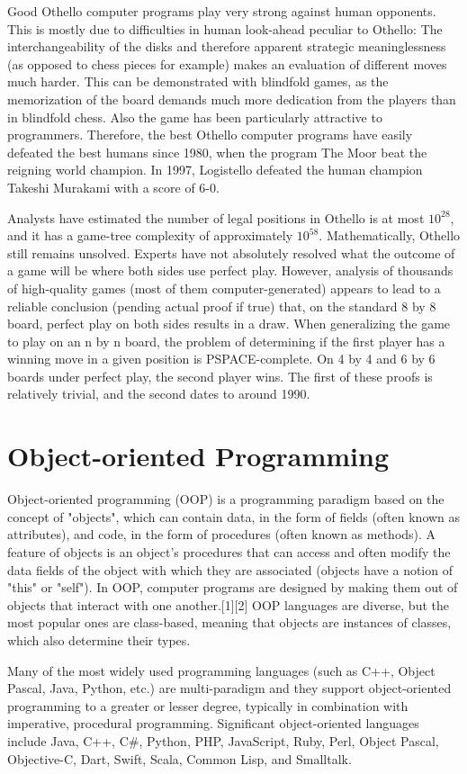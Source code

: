 \documentclass[a4paper]{report}
\begin{document}
Good Othello computer programs play very strong against human opponents. This is mostly due to difficulties in human look-ahead peculiar to Othello: The interchangeability of the disks and therefore apparent strategic meaninglessness (as opposed to chess pieces for example) makes an evaluation of different moves much harder. This can be demonstrated with blindfold games, as the memorization of the board demands much more dedication from the players than in blindfold chess. Also the game has been particularly attractive to programmers. Therefore, the best Othello computer programs have easily defeated the best humans since 1980, when the program The Moor beat the reigning world champion. In 1997, Logistello defeated the human champion Takeshi Murakami with a score of 6-0. 
\par
Analysts have estimated the number of legal positions in Othello is at most $10^28$, and it has a game-tree complexity of approximately $10^58$. Mathematically, Othello still remains unsolved. Experts have not absolutely resolved what the outcome of a game will be where both sides use perfect play. However, analysis of thousands of high-quality games (most of them computer-generated) appears to lead to a reliable conclusion (pending actual proof if true) that, on the standard 8 by 8 board, perfect play on both sides results in a draw. When generalizing the game to play on an n by n board, the problem of determining if the first player has a winning move in a given position is PSPACE-complete. On 4 by 4 and 6 by 6 boards under perfect play, the second player wins. The first of these proofs is relatively trivial, and the second dates to around 1990. 

\section{Object-oriented Programming}
Object-oriented programming (OOP) is a programming paradigm based on the concept of "objects", which can contain data, in the form of fields (often known as attributes), and code, in the form of procedures (often known as methods). A feature of objects is an object's procedures that can access and often modify the data fields of the object with which they are associated (objects have a notion of "this" or "self"). In OOP, computer programs are designed by making them out of objects that interact with one another.[1][2] OOP languages are diverse, but the most popular ones are class-based, meaning that objects are instances of classes, which also determine their types. 
\par
Many of the most widely used programming languages (such as C++, Object Pascal, Java, Python, etc.) are multi-paradigm and they support object-oriented programming to a greater or lesser degree, typically in combination with imperative, procedural programming. Significant object-oriented languages include Java, C++, C\#, Python, PHP, JavaScript, Ruby, Perl, Object Pascal, Objective-C, Dart, Swift, Scala, Common Lisp, and Smalltalk. 
\end{document}
